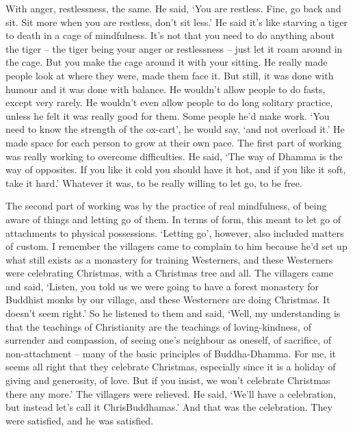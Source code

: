 With anger, restlessness, the same. He said, `You are restless. Fine, go
back and sit. Sit more when you are restless, don't sit less.' He said
it's like starving a tiger to death in a cage of mindfulness. It's not
that you need to do anything about the tiger -- the tiger being your
anger or restlessness -- just let it roam around in the cage. But you
make the cage around it with your sitting. He really made people look at
where they were, made them face it. But still, it was done with humour
and it was done with balance. He wouldn't allow people to do fasts,
except very rarely. He wouldn't even allow people to do long solitary
practice, unless he felt it was really good for them. Some people he'd
make work. `You need to know the strength of the ox-cart', he would say,
`and not overload it.' He made space for each person to grow at their
own pace. The first part of working was really working to overcome
difficulties. He said, `The way of Dhamma is the way of opposites. If
you like it cold you should have it hot, and if you like it soft, take
it hard.' Whatever it was, to be really willing to let go, to be free.

The second part of working was by the practice of real mindfulness, of
being aware of things and letting go of them. In terms of form, this
meant to let go of attachments to physical possessions. `Letting go',
however, also included matters of custom. I remember the villagers came
to complain to him because he'd set up what still exists as a monastery
for training Westerners, and these Westerners were celebrating
Christmas, with a Christmas tree and all. The villagers came and said,
`Listen, you told us we were going to have a forest monastery for
Buddhist monks by our village, and these Westerners are doing Christmas.
It doesn't seem right.' So he listened to them and said, `Well, my
understanding is that the teachings of Christianity are the teachings of
loving-kindness, of surrender and compassion, of seeing one's neighbour
as oneself, of sacrifice, of non-attachment -- many of the basic
principles of Buddha-Dhamma. For me, it seems all right that they
celebrate Christmas, especially since it is a holiday of giving and
generosity, of love. But if you insist, we won't celebrate Christmas
there any more.' The villagers were relieved. He said, `We'll have a
celebration, but instead let's call it ChrisBuddhamas.' And that was the
celebration. They were satisfied, and he was satisfied.

